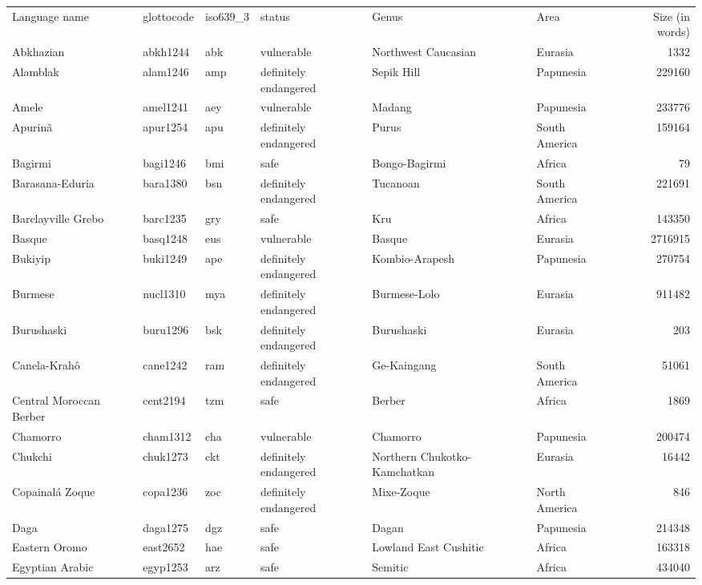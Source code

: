\begin{longtable}{llllllr}
  \hline
Language name & glottocode & iso639\_3 & status & Genus & Area & Size (in words) \\ 
 Abkhazian & abkh1244 & abk & vulnerable & Northwest Caucasian & Eurasia & 1332 \\ 
  Alamblak & alam1246 & amp & definitely endangered & Sepik Hill & Papunesia & 229160 \\ 
  Amele & amel1241 & aey & vulnerable & Madang & Papunesia & 233776 \\ 
  Apurinã & apur1254 & apu & definitely endangered & Purus & South America & 159164 \\ 
  Bagirmi & bagi1246 & bmi & safe & Bongo-Bagirmi & Africa & 79 \\ 
  Barasana-Eduria & bara1380 & bsn & definitely endangered & Tucanoan & South America & 221691 \\ 
  Barclayville Grebo & barc1235 & gry & safe & Kru & Africa & 143350 \\ 
  Basque & basq1248 & eus & vulnerable & Basque & Eurasia & 2716915 \\ 
  Bukiyip & buki1249 & ape & definitely endangered & Kombio-Arapesh & Papunesia & 270754 \\ 
  Burmese & nucl1310 & mya & definitely endangered & Burmese-Lolo & Eurasia & 911482 \\ 
  Burushaski & buru1296 & bsk & definitely endangered & Burushaski & Eurasia & 203 \\ 
  Canela-Krahô & cane1242 & ram & definitely endangered & Ge-Kaingang & South America & 51061 \\ 
  Central Moroccan Berber & cent2194 & tzm & safe & Berber & Africa & 1869 \\ 
  Chamorro & cham1312 & cha & vulnerable & Chamorro & Papunesia & 200474 \\ 
  Chukchi & chuk1273 & ckt & definitely endangered & Northern Chukotko-Kamchatkan & Eurasia & 16442 \\ 
  Copainalá Zoque & copa1236 & zoc & definitely endangered & Mixe-Zoque & North America & 846 \\ 
  Daga & daga1275 & dgz & safe & Dagan & Papunesia & 214348 \\ 
  Eastern Oromo & east2652 & hae & safe & Lowland East Cushitic & Africa & 163318 \\ 
  Egyptian Arabic & egyp1253 & arz & safe & Semitic & Africa & 434040 \\ 

\end{longtable}
